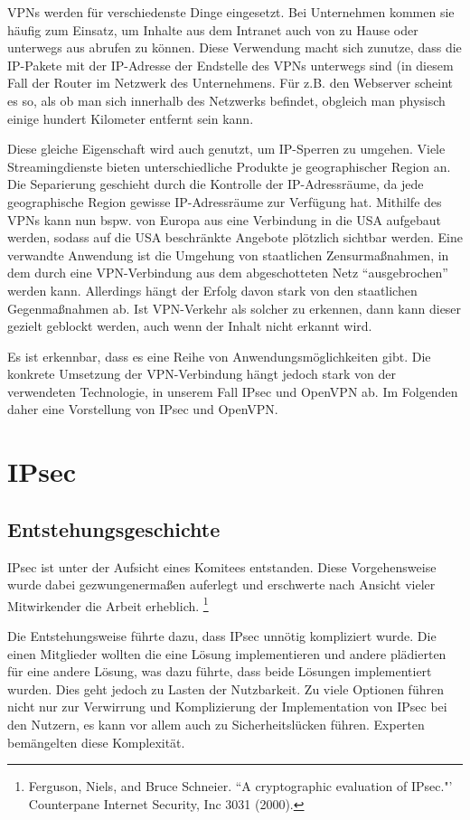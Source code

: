 \documentclass[12pt]{scrartcl}
\begin{document}
VPNs werden für verschiedenste Dinge eingesetzt. Bei Unternehmen kommen sie häufig zum Einsatz, um Inhalte aus dem Intranet auch von zu Hause oder unterwegs aus abrufen zu können. Diese Verwendung macht sich zunutze, dass die IP-Pakete mit der IP-Adresse der Endstelle des VPNs unterwegs sind (in diesem Fall der Router im Netzwerk des Unternehmens. Für z.B. den Webserver scheint es so, als ob man sich innerhalb des Netzwerks befindet, obgleich man physisch einige hundert Kilometer entfernt sein kann.

Diese gleiche Eigenschaft wird auch genutzt, um IP-Sperren zu umgehen. Viele Streamingdienste bieten unterschiedliche Produkte je geographischer Region an. Die Separierung geschieht durch die Kontrolle der IP-Adressräume, da jede geographische Region gewisse IP-Adressräume zur Verfügung hat. Mithilfe des VPNs kann nun bspw. von Europa aus eine Verbindung in die USA aufgebaut werden, sodass auf die USA beschränkte Angebote plötzlich sichtbar werden. Eine verwandte Anwendung ist die Umgehung von staatlichen Zensurmaßnahmen, in dem durch eine VPN-Verbindung aus dem abgeschotteten Netz "`ausgebrochen"' werden kann. Allerdings hängt der Erfolg davon stark von den staatlichen Gegenmaßnahmen ab. Ist VPN-Verkehr als solcher zu erkennen, dann kann dieser gezielt geblockt werden, auch wenn der Inhalt nicht erkannt wird.

Es ist erkennbar, dass es eine Reihe von Anwendungsmöglichkeiten gibt. Die konkrete Umsetzung der VPN-Verbindung hängt jedoch stark von der verwendeten Technologie, in unserem Fall IPsec und OpenVPN ab. Im Folgenden daher eine Vorstellung von IPsec und OpenVPN.

\section{IPsec}
\subsection{Entstehungsgeschichte}
IPsec ist unter der Aufsicht eines Komitees entstanden. Diese Vorgehensweise wurde dabei gezwungenermaßen auferlegt und erschwerte nach Ansicht vieler Mitwirkender die Arbeit erheblich. \footnote{Ferguson, Niels, and Bruce Schneier. ``A cryptographic evaluation of IPsec."' Counterpane Internet Security, Inc 3031 (2000).} 

Die Entstehungsweise führte dazu, dass IPsec unnötig kompliziert wurde. Die einen Mitglieder wollten die eine Lösung implementieren und andere plädierten für eine andere Lösung, was dazu führte, dass beide Lösungen implementiert wurden. Dies geht jedoch zu Lasten der Nutzbarkeit. Zu viele Optionen führen nicht nur zur Verwirrung und Komplizierung der Implementation von IPsec bei den Nutzern, es kann vor allem auch zu Sicherheitslücken führen. Experten bemängelten diese Komplexität.
\end{document}
